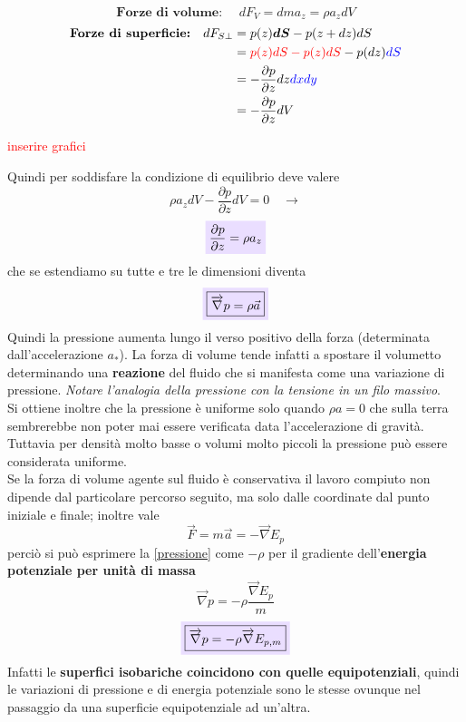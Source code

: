 \documentclass[x11names]{report}
\newcommand{\viola}[1]{\colorbox{yred}{$\displaystyle #1$}}
\begin{document}
	\begin{es}{}
		\begin{minipage}{0.5\textwidth}
			\[ 
			\textbf{Forze di volume: } \quad dF_V = dma_z = \rho a_z dV
			\]
			\begin{align*}
				\textbf{Forze di superficie:} \quad dF_{S\perp} &= p(z)\boldsymbol{dS} - p(z + dz)dS \\
				&= \textcolor{red}{p(z)dS - p(z)dS} - p(dz)\textcolor{blue}{dS} \\
				&= -\frac{\partial p}{\partial z}dz \textcolor{blue}{dxdy} \\
				&=-\frac{\partial p}{\partial z} dV 
			\end{align*}
		\end{minipage}
		\begin{minipage}{0.5\textwidth}
			\begin{center}
				\textcolor{red}{inserire grafici}
			\end{center}
		\end{minipage}
	\end{es}
	\noindent
	Quindi per soddisfare la condizione di equilibrio deve valere
	\[ 
	\rho a_z dV -\frac{\partial p}{\partial z} dV  = 0 \quad \to
	\]
	\begin{equation}
		\viola{\frac{\partial p}{\partial z} = \rho a_z }
	\end{equation}
	che se estendiamo su tutte e tre le dimensioni diventa
	\begin{equation}\label{pressione}
		\viola{\boxed{\overrightarrow{\nabla} p = \rho \vec{a}}}
	\end{equation}
	Quindi la pressione aumenta lungo il verso positivo della forza (determinata dall'accelerazione \(a_*\)). La forza di volume tende infatti a spostare il volumetto determinando una \textbf{reazione} del fluido che si manifesta come una variazione di pressione. \textit{Notare l'analogia della pressione con la tensione in un filo massivo}.\\
	Si ottiene inoltre che la pressione è uniforme solo quando \(\rho a = 0\) che sulla terra sembrerebbe non poter mai essere verificata data l'accelerazione di gravità. Tuttavia per densità molto basse o volumi molto piccoli la pressione può essere considerata uniforme. \\
	
	\noindent
	Se la forza di volume agente sul fluido è conservativa il lavoro compiuto non dipende dal particolare percorso seguito, ma solo dalle coordinate dal punto iniziale e finale; inoltre vale
	\[ 
	\overrightarrow{F} = m \vec{a} = -\overrightarrow{\nabla}E_p
	\]
	perciò si può esprimere la \ref{pressione} come \(-\rho\) per il gradiente dell'\textbf{energia potenziale per unità%
	\noindent
 di massa}
	\[
	\overrightarrow{\nabla} p = -\rho \frac{\overrightarrow{\nabla}E_p}{m}
	\]
	\begin{equation}\label{gradiente pressione}
		\viola{\boxed{\overrightarrow{\nabla} p = -\rho \overrightarrow{\nabla}E_{p,m}}}
	\end{equation}
	Infatti le \textbf{superfici isobariche coincidono con quelle equipotenziali}, quindi le variazioni di pressione e di energia potenziale sono le stesse ovunque nel passaggio da una superficie equipotenziale ad un'altra. 
	
\end{document}
